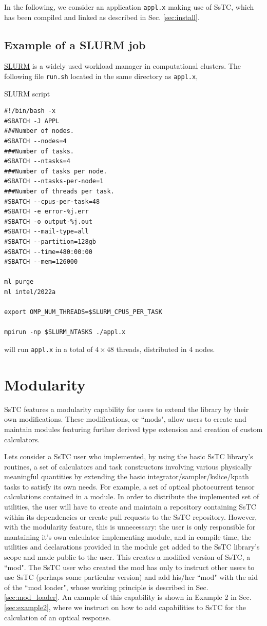 \documentclass[10pt,a4paper]{article}
\begin{document}
In the following, we consider an application \verb|appl.x| making use of SsTC, which has been compiled and linked as described in Sec. \ref{sec:install}.
\subsection{Example of a SLURM job}
\href{https://slurm.schedmd.com/documentation.html}{SLURM} is a widely used workload manager in computational clusters. The following file \verb|run.sh| located in the same directory as \verb|appl.x|,
\begin{codebox}{SLURM script}
\begin{lstlisting}[caption={File ``run".},captionpos=b]
#!/bin/bash -x
#SBATCH -J APPL
###Number of nodes.
#SBATCH --nodes=4
###Number of tasks.
#SBATCH --ntasks=4
###Number of tasks per node.
#SBATCH --ntasks-per-node=1
###Number of threads per task.
#SBATCH --cpus-per-task=48
#SBATCH -e error-%j.err
#SBATCH -o output-%j.out
#SBATCH --mail-type=all
#SBATCH --partition=128gb
#SBATCH --time=480:00:00
#SBATCH --mem=126000

ml purge
ml intel/2022a

export OMP_NUM_THREADS=$SLURM_CPUS_PER_TASK

mpirun -np $SLURM_NTASKS ./appl.x
\end{lstlisting}
\end{codebox}
will run \verb|appl.x| in a total of $4\times 48$ threads, distributed in 4 nodes.
\section{Modularity}\label{sec:modularity}
SsTC features a modularity capability for users to extend the library by their own modifications. These modifications, or ``mods", allow users to create and maintain modules featuring further derived type extension and creation of custom calculators.

Lets consider a SsTC user who implemented, by using the basic SsTC library's routines, a set of calculators and task constructors involving various physically meaningful quantities by extending the basic integrator/sampler/kslice/kpath tasks to satisfy its own needs. For example, a set of optical photocurrent tensor calculations contained in a module. In order to distribute the implemented set of utilities, the user will have to create and maintain a repository containing SsTC within its dependencies or create pull requests to the SsTC repository. However, with the modularity feature, this is unnecessary: the user is only responsible for mantaining it's own calculator implementing module, and in compile time, the utilities and declarations provided in the module get added to the SsTC library's scope and made public to the user. This creates a modified version of SsTC, a ``mod". The SsTC user who created the mod has only to instruct other users to use SsTC (perhaps some particular version) and add his/her ``mod" with the aid of the ``mod loader", whose working principle is described in Sec. \ref{sec:mod_loader}. An example of this capability is shown in Example 2 in Sec. \ref{sec:example2}, where we instruct on how to add capabilities to SsTC for the calculation of an optical response.
\end{document}
